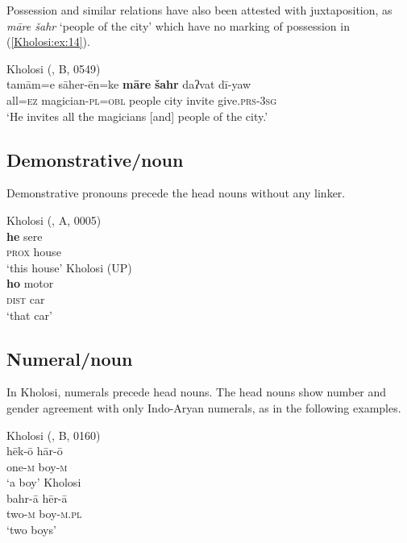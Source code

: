 \documentclass[output=paper,colorlinks,citecolor=brown]{langscibook}
\begin{document}
Possession and similar relations have also been attested with juxtaposition, as \textit{māre šahr} `people of the city' which have no marking of possession in (\ref{Kholosi:ex:14}).

\ea\label{Kholosi:ex:14}
Kholosi (\citealt{nourzaei_kholosi_2022}, B, 0549)\\
\gll tamām=e sāher-ēn=ke \textbf{māre} \textbf{šahr} daʔvat dī-yaw \\
all\textsc{=ez} magician\textsc{-pl=obl} people city invite give\textsc{.prs-3sg} \\
\glt `He invites all the magicians [and] people of the city.'
\z

\subsection{Demonstrative/noun}\label{Kholosi:ss:3.3}

Demonstrative pronouns precede the head nouns without any linker. 

\ea\label{Kholosi:ex:15}
\ea\label{Kholosi:ex:15a}
Kholosi (\citealt{nourzaei_kholosi_2022}, A, 0005)\\
\gll \textbf{he} sere \\
\textsc{prox} house \\
\glt `this house'
\ex\label{Kholosi:ex:15b}
Kholosi (UP)\\
\gll \textbf{ho} motor \\
\textsc{dist} car \\
\glt `that car'
\z
\z

\subsection{Numeral/noun}\label{Kholosi:ss:3.4}

In Kholosi, numerals precede head nouns. The head nouns show number and gender agreement with only Indo-Aryan numerals, as in the following examples.

\ea\label{Kholosi:ex:16}
\ea\label{Kholosi:ex:16a}
Kholosi (\citealt{nourzaei_kholosi_2022}, B, 0160)\\
\gll hēk-ō hār-ō \\
one\textsc{-m} boy\textsc{-m} \\
\glt `a boy' 
\ex\label{Kholosi:ex:16b}
Kholosi\\
\gll bahr-ā hēr-ā \\
two\textsc{-m} boy\textsc{-m.pl} \\
\glt `two boys'
\z
\z
\end{document}
